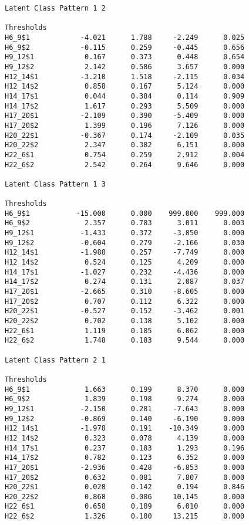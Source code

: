 \begin{verbatim}
Latent Class Pattern 1 2

Thresholds
H6_9$1            -4.021      1.788     -2.249      0.025
H6_9$2            -0.115      0.259     -0.445      0.656
H9_12$1            0.167      0.373      0.448      0.654
H9_12$2            2.142      0.586      3.657      0.000
H12_14$1          -3.210      1.518     -2.115      0.034
H12_14$2           0.858      0.167      5.124      0.000
H14_17$1           0.044      0.384      0.114      0.909
H14_17$2           1.617      0.293      5.509      0.000
H17_20$1          -2.109      0.390     -5.409      0.000
H17_20$2           1.399      0.196      7.126      0.000
H20_22$1          -0.367      0.174     -2.109      0.035
H20_22$2           2.347      0.382      6.151      0.000
H22_6$1            0.754      0.259      2.912      0.004
H22_6$2            2.542      0.264      9.646      0.000

Latent Class Pattern 1 3

Thresholds
H6_9$1           -15.000      0.000    999.000    999.000
H6_9$2             2.357      0.783      3.011      0.003
H9_12$1           -1.433      0.372     -3.850      0.000
H9_12$2           -0.604      0.279     -2.166      0.030
H12_14$1          -1.988      0.257     -7.749      0.000
H12_14$2           0.524      0.125      4.209      0.000
H14_17$1          -1.027      0.232     -4.436      0.000
H14_17$2           0.274      0.131      2.087      0.037
H17_20$1          -2.665      0.310     -8.605      0.000
H17_20$2           0.707      0.112      6.322      0.000
H20_22$1          -0.527      0.152     -3.462      0.001
H20_22$2           0.702      0.138      5.102      0.000
H22_6$1            1.119      0.185      6.062      0.000
H22_6$2            1.748      0.183      9.544      0.000

Latent Class Pattern 2 1

Thresholds
H6_9$1             1.663      0.199      8.370      0.000
H6_9$2             1.839      0.198      9.274      0.000
H9_12$1           -2.150      0.281     -7.643      0.000
H9_12$2           -0.869      0.140     -6.190      0.000
H12_14$1          -1.978      0.191    -10.349      0.000
H12_14$2           0.323      0.078      4.139      0.000
H14_17$1           0.237      0.183      1.293      0.196
H14_17$2           0.782      0.123      6.352      0.000
H17_20$1          -2.936      0.428     -6.853      0.000
H17_20$2           0.632      0.081      7.807      0.000
H20_22$1           0.028      0.142      0.194      0.846
H20_22$2           0.868      0.086     10.145      0.000
H22_6$1            0.658      0.109      6.010      0.000
H22_6$2            1.326      0.100     13.215      0.000


\end{verbatim}
